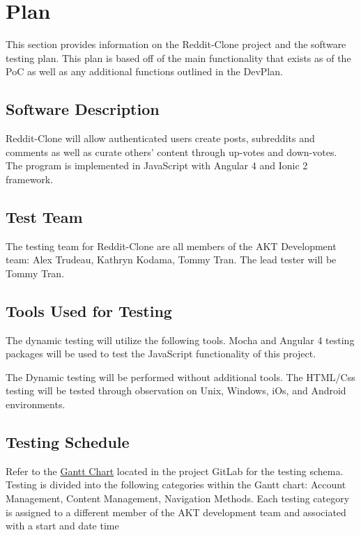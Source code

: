 \documentclass[12pt,fleqn]{article}
\begin{document}
\pagebreak
\section {Plan}
This section provides information on the Reddit-Clone project and the software testing plan. This plan is based off of the main functionality that exists as of the PoC as well as any additional functions outlined in the DevPlan.

\subsection {Software Description}
Reddit-Clone will allow authenticated users create posts, subreddits and comments as well as curate others' content through up-votes and down-votes.  The program is implemented in JavaScript with Angular 4 and Ionic 2 framework.

\subsection {Test Team}
The testing team for Reddit-Clone are all members of the AKT Development team: Alex Trudeau, Kathryn Kodama, Tommy Tran.  The lead tester will be Tommy Tran.

\subsection {Tools Used for Testing}
The dynamic testing will utilize the following tools.  Mocha and Angular 4 testing packages will be used to test the JavaScript functionality of this project.

The Dynamic testing will be performed without additional tools.  The HTML/Css testing will be tested through observation on Unix, Windows, iOs, and Android environments.

\subsection {Testing Schedule}

Refer to the \href{https://gitlab.cas.mcmaster.ca/trudeaua/reddit-clone/blob/master/Documentation/Gantt_27_10_17.pdf}{Gantt Chart} located in the project GitLab for the testing schema.   Testing is divided into the following categories within the Gantt chart: Account Management, Content Management, Navigation Methods.  Each testing category is assigned to a different member of the AKT development team and associated with a start and date time
\end{document}
